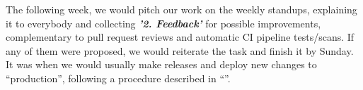 The following week, we would pitch our work on the weekly standups, explaining it to everybody and collecting \textbf{\textit{'2. Feedback'}} for possible improvements, complementary to pull request reviews and automatic CI pipeline tests/scans. If any of them were proposed, we would reiterate the task and finish it by Sunday. It was when we would usually make releases and deploy new changes to “production”, following a procedure described in “”.
